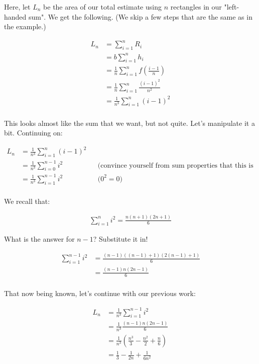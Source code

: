 \documentclass{article}
\begin{document}


Here, let $L_n$ be the area of our total estimate using $n$ rectangles in our "left-handed sum". We get the following. (We skip a few steps that are the same as in the example.)

\begin{align*}
L_n &= \sum_{i=1}^n R_i \\
&= b \sum_{i=1}^n h_i \\
&= \frac{1}{n} \sum_{i=1}^n f(\frac{i-1}{n}) \\
&= \frac{1}{n} \sum_{i=1}^n \frac{(i-1)^2}{n^2} \\
&= \frac{1}{n^3} \sum_{i=1}^n (i-1)^2 \\
\end{align*}

This looks almost like the sum that we want, but not quite. Let's manipulate it a bit. Continuing on: 


\begin{align*}
L_n &= \frac{1}{n^3} \sum_{i=1}^n (i-1)^2 \\
&= \frac{1}{n^3} \sum_{i=0}^{n-1} i^2 && \text{(convince yourself from sum properties that this is true)} \\
&= \frac{1}{n^3} \sum_{i=1}^{n-1} i^2 && \text{($0^2 = 0$)} \\
\end{align*}

We recall that:

\begin{align*}
\sum_{i=1}^n i^2 = \frac{n(n+1)(2n+1)}{6}
\end{align*}

What is the answer for $n-1$? Substitute it in!

\begin{align*}
\sum_{i=1}^{n-1} i^2 &= \frac{(n-1)((n-1)+1)(2(n-1)+1)}{6} \\
&= \frac{(n-1)n(2n-1)}{6} \\
\end{align*}


That now being known, let's continue with our previous work:

\begin{align*}
L_n &= \frac{1}{n^3} \sum_{i=1}^{n-1} i^2 \\
&= \frac{1}{n^3} \frac{(n-1)n(2n-1)}{6} \\
&= \frac{1}{n^3} \left( \frac{n^3}{3} - \frac{n^2}{2} + \frac{n}{6} \right) \\
&= \frac{1}{3} - \frac{1}{2n} + \frac{1}{6n^2}
\end{align*}
\end{document}
